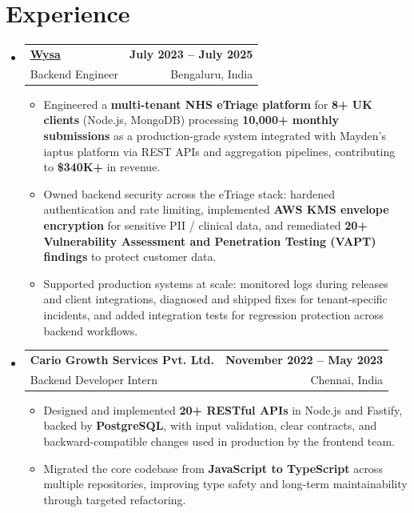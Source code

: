 \documentclass[letterpaper,10pt]{article}
\makeatletter
\newcommand{\resumeItem}[1]{
  \item\small{#1\vspace{-1pt}}
}
\newcommand{\resumeSubheading}[4]{
  \vspace{1pt}\item
    \begin{tabular*}{0.985\textwidth}[t]{l@{\extracolsep{\fill}}r}
      \textbf{#1} & \textbf{\small #2} \\
      {\small\color{ResumeSlate} #3} & {\small\color{ResumeSlate} #4} \\
    \end{tabular*}\vspace{-6pt}
}
\newcommand{\resumeSubHeadingListStart}{\begin{itemize}[leftmargin=0.0in, label={}, itemsep=2pt, topsep=2pt]}
\newcommand{\resumeSubHeadingListEnd}{\end{itemize}}
\newcommand{\resumeItemListStart}{\begin{itemize}[leftmargin=0.18in, itemsep=2pt, topsep=1pt]}
\newcommand{\resumeItemListEnd}{\end{itemize}\vspace{-4pt}}
\makeatother
\begin{document}
\section{Experience}
\resumeSubHeadingListStart
  \resumeSubheading
    {\href{https://www.wysa.io}{Wysa}}{July 2023 -- July 2025}
    {Backend Engineer}{Bengaluru, India}
    \resumeItemListStart
      \resumeItem{Engineered a \textbf{multi-tenant NHS eTriage platform} for \textbf{8+ UK clients} (Node.js, MongoDB) processing \textbf{10{,}000+ monthly submissions} as a production-grade system integrated with Mayden's iaptus platform via REST APIs and aggregation pipelines, contributing to \textbf{\$340K+} in revenue.}
      \resumeItem{Owned backend security across the eTriage stack: hardened authentication and rate limiting, implemented \textbf{AWS KMS envelope encryption} for sensitive PII / clinical data, and remediated \textbf{20+ Vulnerability Assessment and Penetration Testing (VAPT) findings} to protect customer data.}
      \resumeItem{Supported production systems at scale: monitored logs during releases and client integrations, diagnosed and shipped fixes for tenant-specific incidents, and added integration tests for regression protection across backend workflows.}
    \resumeItemListEnd
  \resumeSubheading
    {Cario Growth Services Pvt. Ltd.}{November 2022 -- May 2023}
    {Backend Developer Intern}{Chennai, India}
    \resumeItemListStart
      \resumeItem{Designed and implemented \textbf{20+ RESTful APIs} in Node.js and Fastify, backed by \textbf{PostgreSQL}, with input validation, clear contracts, and backward-compatible changes used in production by the frontend team.}
      \resumeItem{Migrated the core codebase from \textbf{JavaScript to TypeScript} across multiple repositories, improving type safety and long-term maintainability through targeted refactoring.}
    \resumeItemListEnd
\resumeSubHeadingListEnd
\vspace{-4pt}
\end{document}
